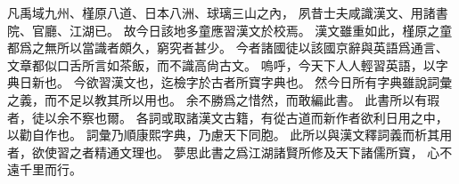 凡禹域九州、槿原八道、日本八洲、球璃三山之內，
夙昔士夫咸識漢文、用諸書院、官廳、江湖已。
故今日該地多童應習漢文於校焉。
漢文雖重如此，槿原之童都爲之無所以當識者頗久，窮究者甚少。
今者諸國徒以該國京辭與英語爲通言、
文章都似口舌所言如茶飯，而不識高尙古文。
嗚呼，今天下人人輕習英語，以字典日新也。
今欲習漢文也，迄檢字於古者所寶字典也。
然今日所有字典雖說詞彙之義，而不足以教其所以用也。
余不勝爲之惜然，而敢編此書。
此書所以有瑕者，徒以余不察也爾。
各詞或取諸漢文古籍，有從古道而新作者欲利日用之中，以勸自作也。
詞彙乃順康熙字典，乃慮天下同胞。
此所以與漢文釋詞義而析其用者，欲使習之者精通文理也。
夢思此書之爲江湖諸賢所修及天下諸儒所寶，
心不遠千里而行。
